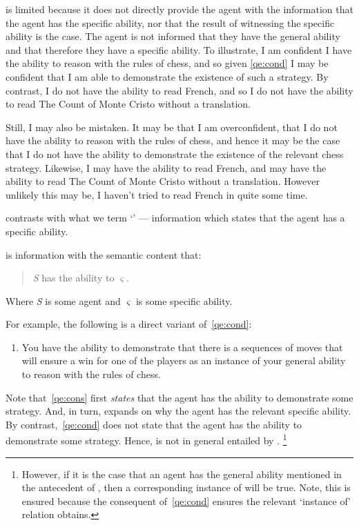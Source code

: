 \begin{note}
  \gsi{} is limited because it does not directly provide the agent with the information that the agent has the specific ability, nor that the result of witnessing the specific ability is the case.
  The agent is not informed that they have the general ability and that therefore they have a specific ability.
  To illustrate, I am confident I have the ability to reason with the rules of chess, and so given \ref{qe:cond} I may be confident that I am able to demonstrate the existence of such a strategy.
  By contrast, I do not have the ability to read French, and so I do not have the ability to read The Count of Monte Cristo without a translation.

  Still, I may also be mistaken.
  It may be that I am overconfident, that I do not have the ability to reason with the rules of chess, and hence it may be the case that I do not have the ability to demonstrate the existence of the relevant chess strategy.
  Likewise, I may have the ability to read French, and may have the ability to read The Count of Monte Cristo without a translation.
  However unlikely this may be, I haven't tried to read French in quite some time.
\end{note}

\begin{note}
  \Gsi{} contrasts with what we term `\dsi{-}' --- information which states that the agent has a specific ability.
  \begin{definition}[\dsi{}]
    \Dsi{-} is information with the semantic content that:
    \begin{quote}
      \emph{S} has the ability to \(\varsigma\).
    \end{quote}
    Where \emph{S} is some agent and \(\varsigma\) is some specific ability.
  \end{definition}
  For example, the following is a direct variant of~\ref{qe:cond}:

  \begin{enumerate}[label=(\dsi{}\arabic*), ref=(\dsi{}\arabic*), series=dsi_count]
  \item\label{qe:cons} You have the ability to demonstrate that there is a sequences of moves that will ensure a win for one of the players as an instance of your general ability to reason with the rules of chess.
  \end{enumerate}

  Note that~\ref{qe:cons} first \emph{states} that the agent has the ability to demonstrate some strategy.
  And, in turn, expands on why the agent has the relevant specific ability.
  By contrast,~\ref{qe:cond} does not state that the agent has the ability to demonstrate some strategy.
  Hence, \dsi{} is not in general entailed by \gsi{}.\nolinebreak
  \footnote{
    However, if it is the case that an agent has the general ability mentioned in the antecedent of \gsi{}, then a corresponding instance of \dsi{} will be true.
    Note, this is ensured because the consequent of~\ref{qe:cond} ensures the relevant `instance of' relation obtains.
  }
\end{note}

